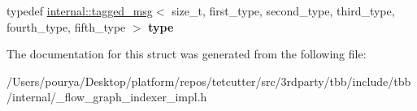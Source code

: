 \begin{DoxyCompactItemize}
\item 
\hypertarget{structinternal_1_1input__types_3_015_00_01InputTuple_01_4_a2c77bd415059db3adced95d73b76c3a0}{}typedef \hyperlink{classinternal_1_1tagged__msg}{internal\+::tagged\+\_\+msg}$<$ size\+\_\+t, first\+\_\+type, second\+\_\+type, third\+\_\+type, fourth\+\_\+type, fifth\+\_\+type $>$ {\bfseries type}\label{structinternal_1_1input__types_3_015_00_01InputTuple_01_4_a2c77bd415059db3adced95d73b76c3a0}

\end{DoxyCompactItemize}


The documentation for this struct was generated from the following file\+:\begin{DoxyCompactItemize}
\item 
/\+Users/pourya/\+Desktop/platform/repos/tetcutter/src/3rdparty/tbb/include/tbb/internal/\+\_\+flow\+\_\+graph\+\_\+indexer\+\_\+impl.\+h\end{DoxyCompactItemize}
